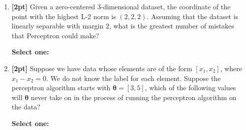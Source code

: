\begin{enumerate}
    \item \textbf{[2pt]} Given a zero-centered 3-dimensional dataset, the coordinate of the point with the highest L-2 norm is $(2, 2, 2)$. Assuming that the dataset is linearly separable with margin 2, what is the greatest number of mistakes that Perceptron could make?

    \textbf{Select one:}

\newpage
    \item \textbf{[2pt]} Suppose we have data whose elements are of the form $[x_1,x_2]$, where $x_1 - x_2 = 0$. We do not know the label for each element. Suppose the perceptron algorithm starts with $\bm{\theta} = [3,5]$, which of the following values will $\bm{\theta}$ never take on in the process of running the perceptron algorithm on the data?

    \textbf{Select one:}
    \begin{list}{}
        \item $\circle$ $[-1,1]$
        \item $\circle$ $[4,6]$
        \item $\circle$ $[-3,-1]$
        \item $\blackcircle$ $[5,5]$
    \end{list}


    
    

    
    

    \clearpage
\end{enumerate}
